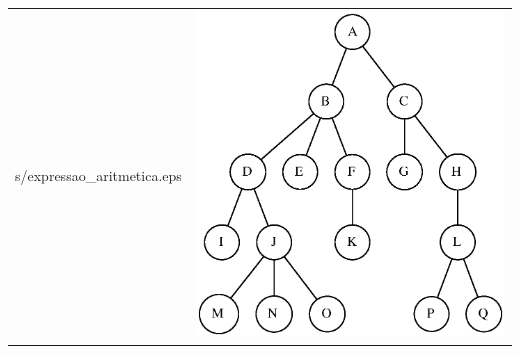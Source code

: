 \documentclass[aspectratio=169]{beamer}
\begin{document}
\begin{frame}[fragile]
\begin{enumerate}
\begin{tabular}{p{}p{}}
s/expressao_aritmetica.eps} & \includegraphics[height=0.55\paperheight]{imagens/arvore_e.eps}\\
\end{tabular}
\end{enumerate}
\end{frame}
\end{document}
